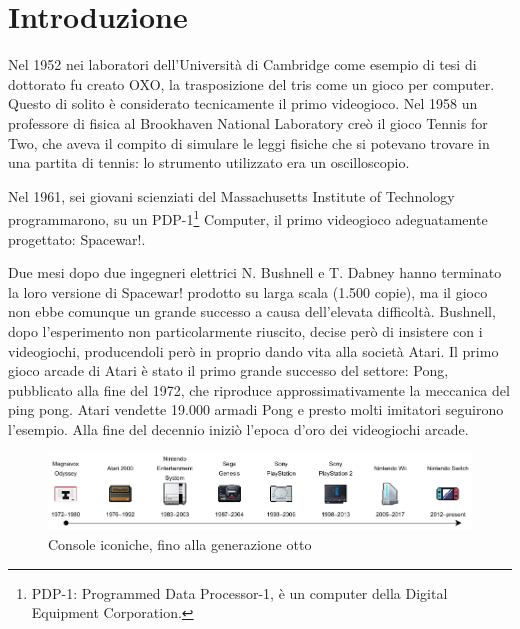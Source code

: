 %
%

\chapter{Introduzione}
\label{cap:Introduzione}

Nel 1952 nei laboratori dell'Università di Cambridge come esempio di tesi di dottorato fu creato OXO, la trasposizione del tris come un gioco per computer. Questo di solito è considerato tecnicamente il primo videogioco. Nel 1958 un professore di fisica al Brookhaven National Laboratory creò il gioco Tennis for Two, che aveva il compito di simulare le leggi fisiche che si potevano trovare in una partita di tennis: lo strumento utilizzato era un oscilloscopio.

Nel 1961, sei giovani scienziati del Massachusetts Institute of Technology programmarono, su un PDP-1\footnote{PDP-1: Programmed Data Processor-1, è un computer della Digital Equipment Corporation.} Computer, il primo videogioco adeguatamente progettato: Spacewar!.

Due mesi dopo due ingegneri elettrici N. Bushnell e T. Dabney hanno terminato la loro versione di Spacewar! prodotto su larga scala (1.500 copie), ma il gioco non ebbe comunque un grande successo a causa dell'elevata difficoltà. Bushnell, dopo l'esperimento non particolarmente riuscito, decise però di insistere con i videogiochi, producendoli però in proprio dando vita alla società Atari. Il primo gioco arcade di Atari è stato il primo grande successo del settore: Pong, pubblicato alla fine del 1972, che riproduce approssimativamente la meccanica del ping pong. Atari vendette 19.000 armadi Pong e presto molti imitatori seguirono l'esempio. Alla fine del decennio iniziò l'epoca d'oro dei videogiochi arcade.

\begin{figure}[H]
	\includegraphics[width=\linewidth]{immagini/consoles_history}
	\caption{Console iconiche, fino alla generazione otto}
	\label{fig:consoles_history}
\end{figure}


